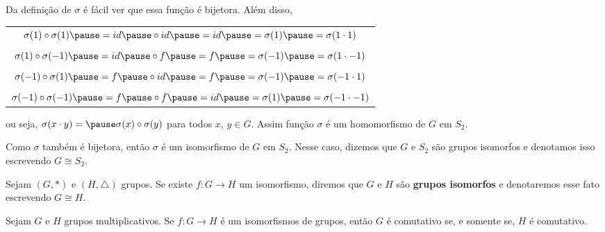 \documentclass{beamer}
\begin{document}
    \begin{frame}
        Da definição de $\sigma$ \pause é fácil ver que essa função é bijetora. \pause Além disso, \pause
        \begin{center}
            \begin{tabular}{c}
                $\sigma(1) \circ \sigma(1) \pause = id \pause \circ id \pause = id \pause = \sigma(1) \pause = \sigma(1 \cdot 1)$\pause\\
                \\
                $\sigma(1) \circ \sigma(-1) \pause = id \pause \circ f \pause = f \pause = \sigma(-1) \pause = \sigma(1 \cdot -1)$ \pause\\
                \\
                $\sigma(-1) \circ \sigma(1) \pause = f \pause \circ id \pause = f \pause = \sigma(-1) \pause = \sigma(-1 \cdot 1)$ \pause\\
                \\
                $\sigma(-1) \circ \sigma(-1) \pause = f \pause \circ f \pause = id \pause = \sigma(1) \pause = \sigma(-1 \cdot -1)$ \pause\\
            \end{tabular}
        \end{center}
        ou seja, $\sigma(x\cdot y) = \pause \sigma(x) \circ \sigma(y)$ \pause para todos $x$, $y \in G$. \pause Assim função $\sigma$ é um homomorfismo de $G$ em $S_2$. \pause

        \vspace{.3cm}

        Como $\sigma$ também é bijetora, \pause então $\sigma$ é um isomorfismo \pause de $G$ em $S_2$. \pause Nesse caso, dizemos que $G$ e $S_2$ são grupos isomorfos \pause e denotamos isso escrevendo $G \cong S_2$.
    \end{frame}

    \begin{frame}
        \begin{definicao}
            Sejam $(G, *)$ e $(H, \triangle)$ grupos. \pause Se existe $f : G \to H$ um isomorfismo, \pause diremos que $G$ e $H$ são \textbf{grupos isomorfos} \pause e denotaremos esse fato escrevendo $G \cong H$.
        \end{definicao}
    \end{frame}

    \begin{frame}
        \begin{proposicao}
            Sejam $G$ e $H$ grupos multiplicativos. \pause Se $f : G \to H$ é um isomorfismos de grupos, então \pause $G$ é comutativo se, e somente se, $H$ é comutativo.
        \end{proposicao}
    \end{frame}
\end{document}
